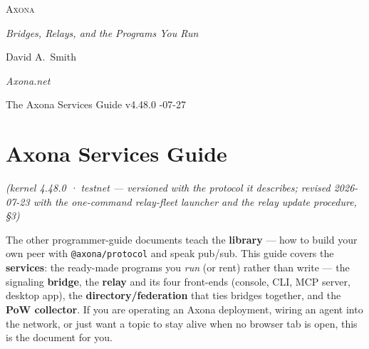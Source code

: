 \documentclass[
  nobib]{tufte-handout}
\author{}
\date{}
\begin{document}
\thispagestyle{empty}
\null\vfill
\begin{center}
{\fontsize{48}{52}\selectfont \textsc{Axona}\par}
\vspace{0.6em}
{\Large\itshape Bridges, Relays, and the Programs You Run\par}
\vspace{4em}
{\large David A.~Smith\par}
{\itshape\small Axona.net\par}
\vspace{2em}
{\small The Axona Services Guide \quad v4.48.0 -07-27\par}
\end{center}
\vfill
\null
\newpage
\pagestyle{ndhtplain}
\thispagestyle{ndhtplain}
\setcounter{page}{1}

\section{Axona Services Guide}\label{axona-services-guide}

\emph{(kernel 4.48.0 · testnet --- versioned with the protocol it
describes; revised 2026-07-23 with the one-command relay-fleet launcher
and the relay update procedure, §3)}

The other programmer-guide documents teach the \textbf{library} --- how
to build your own peer with \texttt{@axona/protocol} and speak pub/sub.
This guide covers the \textbf{services}: the ready-made programs you
\emph{run} (or rent) rather than write --- the signaling
\textbf{bridge}, the \textbf{relay} and its four front-ends (console,
CLI, MCP server, desktop app), the \textbf{directory/federation} that
ties bridges together, and the \textbf{PoW collector}. If you are
operating an Axona deployment, wiring an agent into the network, or just
want a topic to stay alive when no browser tab is open, this is the
document for you.
\end{document}
